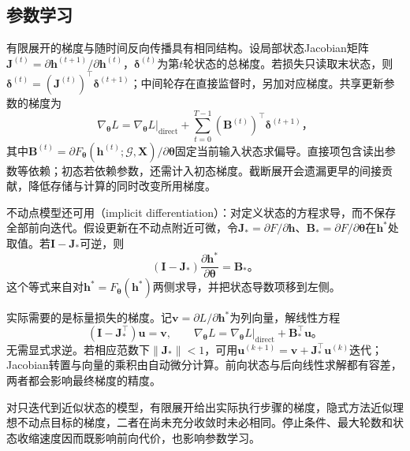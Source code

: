 \subsection{参数学习}
\label{sec:gnn-recurrent-learning}

有限展开的梯度与随时间反向传播具有相同结构。设局部状态Jacobian矩阵$\bm{J}^{(t)}=\partial\bm{h}^{(t+1)}/\partial\bm{h}^{(t)}$，$\bm{\delta}^{(t)}$为第$t$轮状态的总梯度。若损失只读取末状态，则$\bm{\delta}^{(t)}=(\bm{J}^{(t)})^{\top}\bm{\delta}^{(t+1)}$；中间轮存在直接监督时，另加对应梯度。共享更新参数的梯度为
\begin{equation}
  \nabla_{\bm{\theta}}L
    =\left.\nabla_{\bm{\theta}}L\right|_{\mathrm{direct}}
      +\sum_{t=0}^{T-1}(\bm{B}^{(t)})^{\top}\bm{\delta}^{(t+1)}\text{，}
  \label{eq:gnn-recurrent-gradient}
\end{equation}
其中$\bm{B}^{(t)}=\partial F_{\bm{\theta}}(\bm{h}^{(t)};\mathcal{G},\bm{X})/\partial\bm{\theta}$固定当前输入状态求偏导。直接项包含读出参数等依赖；初态若依赖参数，还需计入初态梯度。截断展开会遗漏更早的间接贡献，降低存储与计算的同时改变所用梯度。

不动点模型还可用（implicit differentiation）：对定义状态的方程求导，而不保存全部前向迭代。假设更新在不动点附近可微，令$\bm{J}_*=\partial F/\partial\bm{h}$、$\bm{B}_*=\partial F/\partial\bm{\theta}$在$\bm{h}^*$处取值。若$\bm{I}-\bm{J}_*$可逆，则
\begin{equation}
  (\bm{I}-\bm{J}_*)\frac{\partial\bm{h}^*}{\partial\bm{\theta}}
    =\bm{B}_*\text{。}
  \label{eq:gnn-implicit-state-gradient}
\end{equation}
这个等式来自对$\bm{h}^*=F_{\bm{\theta}}(\bm{h}^*)$两侧求导，并把状态导数项移到左侧。

实际需要的是标量损失的梯度。记$\bm{v}=\partial L/\partial\bm{h}^*$为列向量，解线性方程
\begin{equation}
  (\bm{I}-\bm{J}_*^{\top})\bm{u}=\bm{v},\qquad
  \nabla_{\bm{\theta}}L
    =\left.\nabla_{\bm{\theta}}L\right|_{\mathrm{direct}}+\bm{B}_*^{\top}\bm{u}\text{。}
  \label{eq:gnn-implicit-loss-gradient}
\end{equation}
无需显式求逆。若相应范数下$\lVert\bm{J}_*\rVert<1$，可用$\bm{u}^{(k+1)}=\bm{v}+\bm{J}_*^{\top}\bm{u}^{(k)}$迭代；Jacobian转置与向量的乘积由自动微分计算。前向状态与后向线性求解都有容差，两者都会影响最终梯度的精度。

对只迭代到近似状态的模型，有限展开给出实际执行步骤的梯度，隐式方法近似理想不动点目标的梯度，二者在尚未充分收敛时未必相同。停止条件、最大轮数和状态收缩速度因而既影响前向代价，也影响参数学习。

